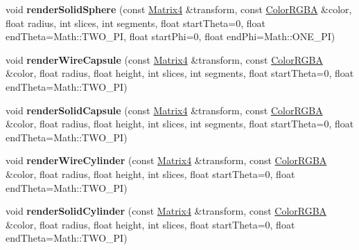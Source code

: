 \begin{DoxyCompactItemize}
\item 
void {\bfseries render\+Solid\+Sphere} (const \hyperlink{class_magnum_1_1_matrix4}{Matrix4} \&transform, const \hyperlink{class_magnum_1_1_color_r_g_b_a}{Color\+R\+G\+BA} \&color, float radius, int slices, int segments, float start\+Theta=0, float end\+Theta=Math\+::\+T\+W\+O\+\_\+\+PI, float start\+Phi=0, float end\+Phi=Math\+::\+O\+N\+E\+\_\+\+PI)\hypertarget{class_magnum_1_1_i_component_debug_renderer_ae03d4196ce07074dfdec1a41648bb33e}{}\label{class_magnum_1_1_i_component_debug_renderer_ae03d4196ce07074dfdec1a41648bb33e}

\item 
void {\bfseries render\+Wire\+Capsule} (const \hyperlink{class_magnum_1_1_matrix4}{Matrix4} \&transform, const \hyperlink{class_magnum_1_1_color_r_g_b_a}{Color\+R\+G\+BA} \&color, float radius, float height, int slices, int segments, float start\+Theta=0, float end\+Theta=Math\+::\+T\+W\+O\+\_\+\+PI)\hypertarget{class_magnum_1_1_i_component_debug_renderer_ad2ddeded7d85647eb913d54e331a79cb}{}\label{class_magnum_1_1_i_component_debug_renderer_ad2ddeded7d85647eb913d54e331a79cb}

\item 
void {\bfseries render\+Solid\+Capsule} (const \hyperlink{class_magnum_1_1_matrix4}{Matrix4} \&transform, const \hyperlink{class_magnum_1_1_color_r_g_b_a}{Color\+R\+G\+BA} \&color, float radius, float height, int slices, int segments, float start\+Theta=0, float end\+Theta=Math\+::\+T\+W\+O\+\_\+\+PI)\hypertarget{class_magnum_1_1_i_component_debug_renderer_a5231d1da4e13f3c5e789435d769aef4d}{}\label{class_magnum_1_1_i_component_debug_renderer_a5231d1da4e13f3c5e789435d769aef4d}

\item 
void {\bfseries render\+Wire\+Cylinder} (const \hyperlink{class_magnum_1_1_matrix4}{Matrix4} \&transform, const \hyperlink{class_magnum_1_1_color_r_g_b_a}{Color\+R\+G\+BA} \&color, float radius, float height, int slices, float start\+Theta=0, float end\+Theta=Math\+::\+T\+W\+O\+\_\+\+PI)\hypertarget{class_magnum_1_1_i_component_debug_renderer_ab3e3aff91ea3b53df3491eb14e4fdf7a}{}\label{class_magnum_1_1_i_component_debug_renderer_ab3e3aff91ea3b53df3491eb14e4fdf7a}

\item 
void {\bfseries render\+Solid\+Cylinder} (const \hyperlink{class_magnum_1_1_matrix4}{Matrix4} \&transform, const \hyperlink{class_magnum_1_1_color_r_g_b_a}{Color\+R\+G\+BA} \&color, float radius, float height, int slices, float start\+Theta=0, float end\+Theta=Math\+::\+T\+W\+O\+\_\+\+PI)\hypertarget{class_magnum_1_1_i_component_debug_renderer_a87a6e169172662ab69b00679228ae6df}{}\label{class_magnum_1_1_i_component_debug_renderer_a87a6e169172662ab69b00679228ae6df}


\end{DoxyCompactItemize}
